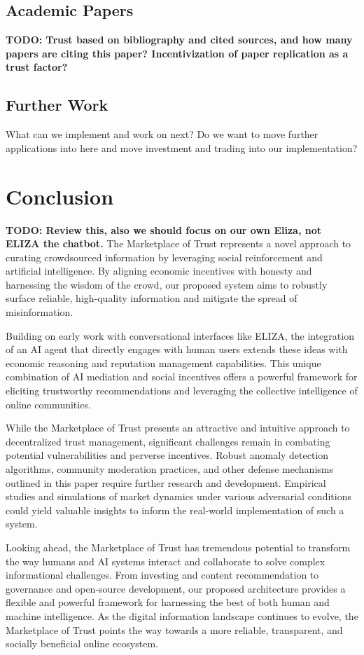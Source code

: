 \documentclass{article}
\begin{document}
\subsection{Academic Papers}
\textbf{TODO: Trust based on bibliography and cited sources, and how many papers are citing this paper?
Incentivization of paper replication as a trust factor?}

\subsection{Further Work}

What can we implement and work on next? Do we want to move further applications into here and move investment and trading into our implementation?

\section{Conclusion}

\textbf{TODO: Review this, also we should focus on our own Eliza, not ELIZA the chatbot.
}
The Marketplace of Trust represents a novel approach to curating crowdsourced information by leveraging social reinforcement and artificial intelligence. By aligning economic incentives with honesty and harnessing the wisdom of the crowd, our proposed system aims to robustly surface reliable, high-quality information and mitigate the spread of misinformation.

Building on early work with conversational interfaces like ELIZA, the integration of an AI agent that directly engages with human users extends these ideas with economic reasoning and reputation management capabilities. This unique combination of AI mediation and social incentives offers a powerful framework for eliciting trustworthy recommendations and leveraging the collective intelligence of online communities.

While the Marketplace of Trust presents an attractive and intuitive approach to decentralized trust management, significant challenges remain in combating potential vulnerabilities and perverse incentives. Robust anomaly detection algorithms, community moderation practices, and other defense mechanisms outlined in this paper require further research and development. Empirical studies and simulations of market dynamics under various adversarial conditions could yield valuable insights to inform the real-world implementation of such a system.

Looking ahead, the Marketplace of Trust has tremendous potential to transform the way humans and AI systems interact and collaborate to solve complex informational challenges. From investing and content recommendation to governance and open-source development, our proposed architecture provides a flexible and powerful framework for harnessing the best of both human and machine intelligence. As the digital information landscape continues to evolve, the Marketplace of Trust points the way towards a more reliable, transparent, and socially beneficial online ecosystem.





\end{document}
